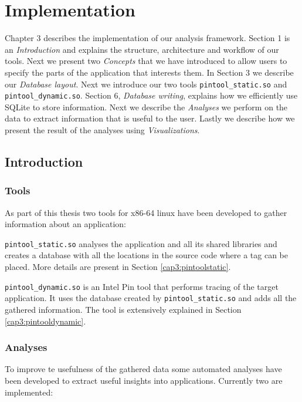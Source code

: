 \chapter{Implementation}

Chapter 3 describes the implementation of our analysis framework. Section 1 is an \textit{Introduction} and explains the structure, architecture and workflow of our tools. Next we present two \textit{Concepts} that we have introduced to allow users to specify the parts of the application that interests them. In Section 3 we describe our \textit{Database layout}. Next we introduce our two tools \texttt{pintool\_static.so} and \texttt{pintool\_dynamic.so}. Section 6, \textit{Database writing}, explains how we efficiently use SQLite to store information. Next we describe the \textit{Analyses} we perform on the data to extract information that is useful to the user. Lastly we describe how we present the result of the analyses using \textit{Visualizations}.

\section{Introduction}

\subsection{Tools}

As part of this thesis two tools for x86-64 linux have been developed to gather information about an application:

\texttt{pintool\_static.so} analyses the application and all its shared libraries and creates a database with all the locations in the source code where a tag can be placed. More details are present in Section \ref{cap3:pintoolstatic}.

\texttt{pintool\_dynamic.so} is an Intel Pin tool that performs tracing of the target application. It uses the database created by \texttt{pintool\_static.so} and adds all the gathered information. The tool is extensively explained in Section \ref{cap3:pintooldynamic}.

\subsection{Analyses}

To improve te usefulness of the gathered data some automated analyses have been developed to extract useful insights into applications. Currently two are implemented:

